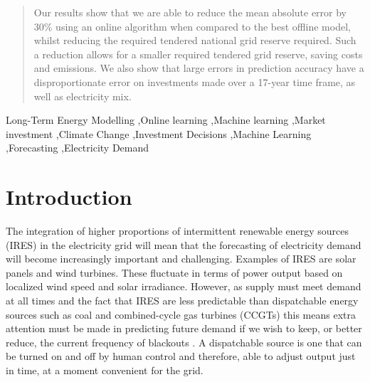 \documentclass[final,3p,times,twocolumn,numbers]{elsarticle}
\begin{document}
\begin{frontmatter}
\begin{abstract}

Our results show that we are able to reduce the mean absolute error by 30\% using an online algorithm when compared to the best offline model, whilst reducing the required tendered national grid reserve required. Such a reduction allows for a smaller required tendered grid reserve, saving costs and emissions. We also show that large errors in prediction accuracy have a disproportionate error on investments made over a 17-year time frame, as well as electricity mix.


\end{abstract}



%
%

\begin{keyword}
Long-Term Energy Modelling \sep Online learning \sep Machine learning \sep Market investment \sep Climate Change \sep Investment Decisions \sep Machine Learning \sep Forecasting \sep  Electricity Demand


\end{keyword}

\end{frontmatter}


\section{Introduction}
\label{sec:intro}

The integration of higher proportions of intermittent renewable energy sources (IRES) in the electricity grid will mean that the forecasting of electricity demand will become increasingly important and challenging. Examples of IRES are solar panels and wind turbines. These fluctuate in terms of power output based on localized wind speed and solar irradiance. However, as supply must meet demand at all times and the fact that IRES are less predictable than dispatchable energy sources such as coal and combined-cycle gas turbines (CCGTs) this means extra attention must be made in predicting future demand if we wish to keep, or better reduce, the current frequency of blackouts \cite{Lu1993}. A dispatchable source is one that can be turned on and off by human control and therefore, able to adjust output just in time, at a moment convenient for the grid.
\end{document}
